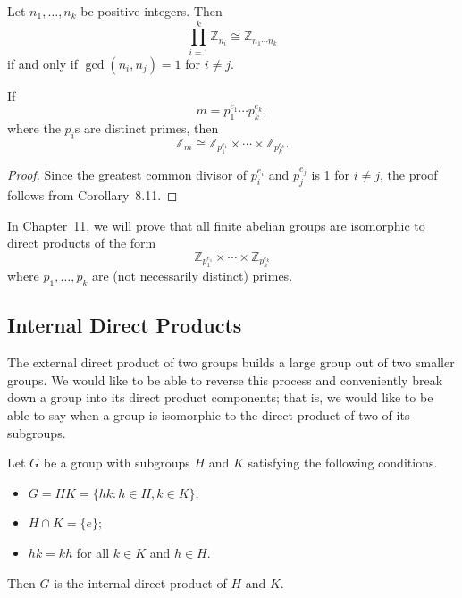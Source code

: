 \begin{corollary}
Let $n_1, \ldots, n_k$ be positive integers. Then
$$
\prod_{i=1}^k {\mathbb Z}_{n_i} \cong {\mathbb Z}_{n_1 \cdots n_k}
$$
if and only if $\gcd( n_i, n_j) =1$ for $i \neq j$.
\end{corollary}

 
\begin{corollary}
If
$$
m = p_1^{e_1} \cdots  p_k^{e_k},
$$
where the $p_i$s are distinct primes, then
$$
{\mathbb Z}_m \cong {\mathbb Z}_{p_1^{e_1}} \times \cdots \times {\mathbb
Z}_{p_k^{e_k}}.
$$
\end{corollary}
 
 
\begin{proof}
Since the greatest common divisor of $p_i^{e_i}$ and $p_j^{e_j}$ is
1 for $i \neq j$, the proof follows from Corollary~8.11.
\end{proof}


\vspace{2ex}


In Chapter~11, we will prove that all finite abelian groups are
isomorphic to direct products of
the form
$$
{\mathbb Z}_{p_1^{e_1}} \times \cdots \times {\mathbb
Z}_{p_k^{e_k}}
$$
where $p_1, \ldots, p_k$ are (not necessarily distinct) primes.

 
 
\subsection*{Internal Direct Products}
 

The external direct product of two groups builds a large group out of
two smaller groups.   We would like to be able to reverse this process
and conveniently break down a group into its direct product
components; that is, we would like to be able to say when a group is
isomorphic to the direct product of two of its subgroups.
 

Let $G$ be a group with subgroups $H$ and $K$ satisfying the following
conditions.
\begin{itemize}
 
\item
$G = HK = \{ hk : h \in H, k \in K  \}$;
 
\item
$H \cap K = \{ e \}$;
 
\item
$hk = kh$ for all $k \in K$ and $h \in H$.
 
\end{itemize}
Then $G$ is the {\bfi internal direct product\/} of $H$ and $K$.


